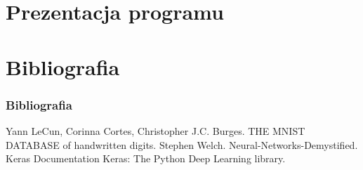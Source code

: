 \documentclass{beamer}
\begin{document}
\section{Prezentacja programu}

\section{Bibliografia}
\begin{frame}[allowframebreaks]

 \frametitle{Bibliografia}
 \begin{thebibliography}{10}
 \beamertemplatearticlebibitems
 Yann LeCun, Corinna Cortes, Christopher J.C. Burges.
 \newblock THE MNIST DATABASE of handwritten digits.
 \beamertemplatearticlebibitems
   Stephen Welch.
   \newblock Neural-Networks-Demystified.
   \beamertemplatearticlebibitems
   Keras Documentation
   \newblock Keras: The Python Deep Learning library.
 
 \end{thebibliography}
 \end{frame}
\end{document}
